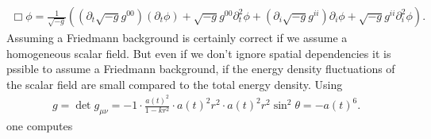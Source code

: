 \documentclass[twoside,a4paper, 12pt]{article}
\numberwithin{equation}{section}
\begin{document}
%
\begin{align*}
    \Box \phi
                                     = \frac{1}{\sqrt{-g}} \left( (\partial_t \sqrt{-g} g^{00}) (\partial_t \phi) + \sqrt{-g} g^{00} \partial^2_t \phi +
                            (\partial_i \sqrt{-g} g^{ii}) \partial_i \phi +
                            \sqrt{-g} g^{ii} \partial^2_i \phi
                            \right).
\end{align*}
Assuming a Friedmann background is certainly correct if we assume a homogeneous
scalar field. But even if we don't ignore spatial dependencies it is pssible to assume a Friedmann background, if the energy density fluctuations
of the scalar field are small compared to the total energy density.
Using 
\begin{align*}
    g = \det g_{\mu \nu} = -1 \cdot \frac{a(t)^2}{1 - kr^2} \cdot a(t)^2 r^2 \cdot a(t)^2 r^2 \sin^2 \theta = - a(t)^6.
\end{align*}
one computes
\end{document}
